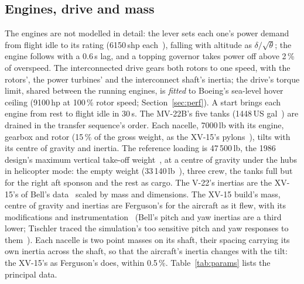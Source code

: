 \documentclass[10pt,a4paper,twocolumn]{article}
\newcommand{\Tab}[1]{}
\begin{document}
\subsection{Engines, drive and mass}
The engines are not modelled in detail: the lever sets each one's power demand from flight idle to its rating (6150\,shp each~\cite{rc}),
falling with altitude as $\delta/\sqrt{\theta}$; the engine follows with a 0.6\,s lag, and a topping governor takes power off above 2\,\% of
overspeed. The interconnected drive gears both rotors to one speed, with the rotors', the power turbines' and the interconnect shaft's inertia; the
drive's torque limit, shared between the running engines, is \emph{fitted} to Boeing's sea-level hover ceiling (9100\,hp at 100\,\% rotor
speed; Section~\ref{sec:perf}). A start brings each engine from rest to flight idle in 30\,s. The MV-22B's five tanks (1448\,US gal~\cite{fs,gs})
are drained in the transfer sequence's order. Each nacelle, 7000\,lb with its engine, gearbox and rotor (15\,\% of the gross weight, as the
XV-15's pylons~\cite{cr}), tilts with its centre of gravity and inertia. The reference loading is 47\,500\,lb, the 1986 design's maximum vertical
take-off weight~\cite{rc}, at a centre of gravity under the hubs in helicopter mode: the empty weight (33\,140\,lb~\cite{fs}), three crew, the tanks full
but for the right aft sponson and the rest as cargo. The V-22's inertias are the XV-15's of Bell's data~\cite{cr} scaled by mass and dimensions. The XV-15
build's mass, centre of gravity and inertias are Ferguson's for the aircraft as it flew, with its modifications and instrumentation~\cite{gt}
(Bell's pitch and yaw inertias are a third lower; Tischler traced the simulation's too sensitive pitch and yaw responses to them~\cite{tt}). Each nacelle
is two point masses on its shaft, their spacing carrying its own inertia across the shaft, so that the aircraft's inertia changes with the tilt: the
XV-15's as Ferguson's does, within 0.5\,\%. Table~\ref{tab:params} lists the
principal data.

\begin{table}[t]
\centering\small
\caption{Principal data of the two builds.}\label{tab:params}
\Tab{params}
\end{table}

\end{document}
